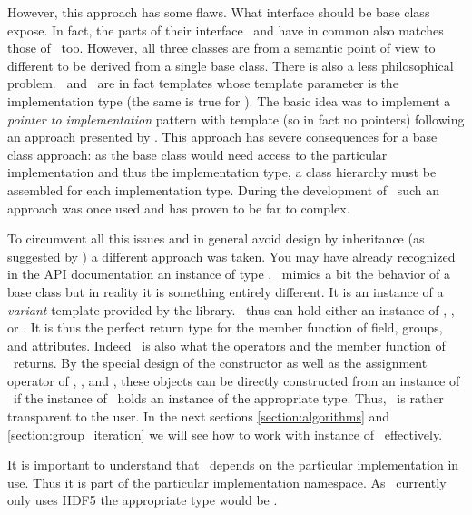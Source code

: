 However, this approach has some flaws. What interface should be base class
expose. In fact, the parts of their interface \nxfield\ and \nxgroup have in
common also matches those of \nxattribute\ too. However, all three classes are
from a semantic point of view to different to be derived from a single base
class.  There is also a less philosophical problem. \nxfield\ and \nxgroup\ are
in fact templates whose template parameter is the implementation type (the same
is true for \nxattribute). The basic idea was to implement a \emph{pointer to
implementation} pattern with template (so in fact no pointers) following an
approach presented by \cite{vandevoorde:2002}. This approach has severe
consequences for a base class approach: as the base class would need access to
the particular implementation and thus the implementation type, a class 
hierarchy must be assembled for each implementation type. During the 
development of \libpniio\ such an approach was once used and has proven to be 
far to complex. 

To circumvent all this issues and in general avoid design by inheritance (as
suggested by \cite{gof:1995}) a different approach was taken. You may have
already recognized in the API documentation an instance of type \nxobject. 
\nxobject\ mimics a bit the behavior of a base class but in reality it is
something entirely different. It is an instance of a \emph{variant} template 
provided by the  library.
\nxobject\ thus can hold either an instance of \nxgroup, \nxfield, or
\nxattribute. It is thus the perfect return type for the  
member function of field, groups, and attributes. Indeed \nxobject\ is also what
the \cpp{[]} operators and the  member function of \nxgroup\ returns. 
By the special design of the constructor as well as the assignment operator
of \nxfield, \nxgroup, and \nxattribute, these objects can be directly
constructed from an instance of \nxobject\ if the instance of \nxobject\ holds
an instance of the appropriate type. 
Thus, \nxobject\ is rather transparent to the user. 
In the next sections \ref{section:algorithms} and \ref{section:group_iteration}
we will see how to work with instance of \nxobject\ effectively.

It is important to understand that \nxobject\ depends on the particular
implementation in use. Thus it is part of the particular implementation
namespace. As \libpniio\ currently only uses HDF5 the appropriate type would be 
.
